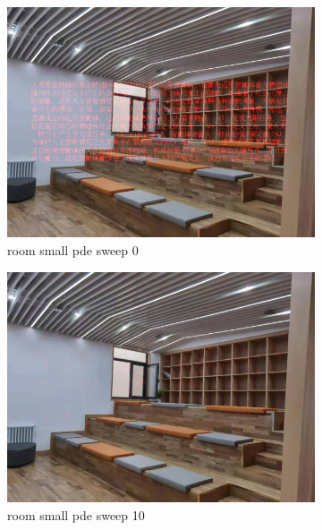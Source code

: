 \documentclass[11pt]{article}
\begin{document}
\begin{figure}[ht!]
    \centering
    \hfill%
    \begin{subfigure}[]{0.333\linewidth}
        \centering
        \includegraphics[width=\linewidth]{fig/restoration/room_small/pde_0.jpg}
        \caption{room small pde sweep 0}
    \end{subfigure}%
    \hfill%
    \begin{subfigure}[]{0.333\linewidth}
        \centering
        \includegraphics[width=\linewidth]{fig/restoration/room_small/pde_10.jpg}
        \caption{room small pde sweep 10}
    \end{subfigure}%
    \hfill%
    \begin{subfigure}[]{0.333\linewidth}

\end{subfigure}
\end{figure}
\end{document}
